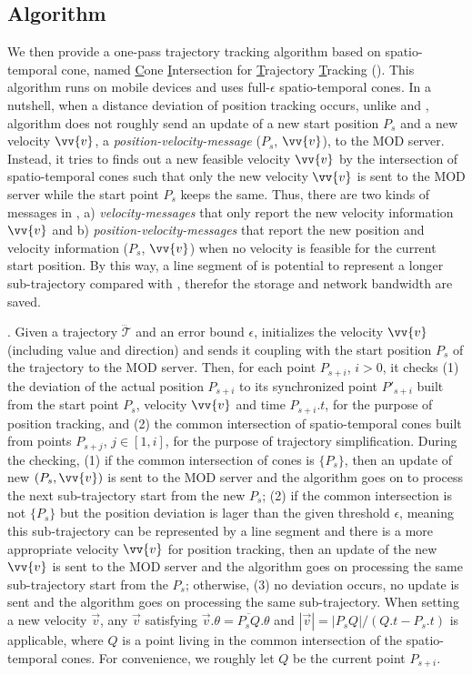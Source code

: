\subsection{Algorithm}
We then provide a one-pass trajectory tracking algorithm based on spatio-temporal cone, named \underline{C}one \underline{I}ntersection for \underline{T}rajectory \underline{T}racking (\citt). This algorithm runs on mobile devices and uses full-$\epsilon$ spatio-temporal cones. In a nutshell, when a distance deviation of position tracking occurs, unlike \ldr and \ldrh, algorithm \citt does not roughly send an update of a new start position $P_s$ and a new velocity $\vv{v}$, \ie a \emph{position-velocity-message} ($P_s$, $\vv{v}$), to the MOD server. Instead, it tries to finds out a new feasible velocity $\vv{v}$ by the intersection of spatio-temporal cones such that only the new velocity $\vv{v}$ is sent to the MOD server while the start point $P_s$ keeps the same. 
Thus, there are two kinds of messages in \citt, a) \emph{velocity-messages} that only report the new velocity information  $\vv{v}$ and b) \emph{position-velocity-messages} that report the new position and velocity information ($P_s$, $\vv{v}$) when no velocity is feasible for the current start position.
By this way, a line segment of \citt is potential to represent a longer sub-trajectory compared with \ldrh, therefor the storage and network bandwidth are saved.

. Given a trajectory $\dddot{\mathcal{T}}$ and an error bound $\epsilon$, \citt initializes the velocity $\vv{v}$ (including value and direction) and sends it coupling with the start position $P_s$ of the trajectory to the MOD server. Then, for each point $P_{s+i}$, $i>0$, it checks (1) the deviation of the actual position $P_{s+i}$ to its synchronized point $P'_{s+i}$ built from the start point $P_s$, velocity $\vv{v}$ and time $P_{s+i}.t$, for the purpose of position tracking, and (2) the common intersection of spatio-temporal cones built from points $P_{s+j}$, $j \in [1, i]$, for the purpose of trajectory simplification.
%
During the checking, (1) if the common intersection of cones is $\{P_s\}$, then an update of new $(P_s, \vv{v})$ is sent to the MOD server and the algorithm goes on to process the next sub-trajectory start from the new $P_s$;
%
(2) if the common intersection is not $\{P_s\}$ but the position deviation is lager than the given threshold $\epsilon$, meaning this sub-trajectory can be represented by a line segment and there is a more appropriate velocity $\vv{v}$ for position tracking, then an update of the new $\vv{v}$ is sent to the MOD server and the algorithm goes on processing the same sub-trajectory start from the $P_s$;
%
otherwise, (3) no deviation occurs, no update is sent and the algorithm goes on processing the same sub-trajectory. 
%
When setting a new velocity $\vec{v}$, any $\vec{v}$ satisfying $\vec{v}.\theta = \overline{P_sQ}.\theta$ and $|\vec{v}|=|P_sQ|/(Q.t-P_s.t)$ is applicable, where $Q$ is a point living in the common intersection of the spatio-temporal cones. For convenience, we roughly let $Q$ be the current point $P_{s+i}$.

